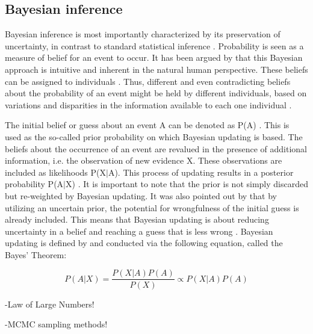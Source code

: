         \subsection{Bayesian inference}
        Bayesian inference is most importantly characterized by its preservation of uncertainty, in contrast to standard statistical inference \citep{davidson2015}. Probability is seen as a measure of belief for an event to occur. It has been argued by \citep{davidson2015}  that this Bayesian approach is intuitive and inherent in the natural human perspective. These beliefs can be assigned to individuals \citep{davidson2015}. Thus, different and even contradicting beliefs about the probability of an event might be held by different individuals, based on variations and disparities in the information available to each one individual \citep{davidson2015}.
        
        The initial belief or guess about an event A can be denoted as P(A) \citep{davidson2015}. This is used as the so-called prior probability on which Bayesian updating is based. The beliefs about the occurrence of an event are revalued in the presence of additional information, i.e. the observation of new evidence X. These observations are included as likelihoods P(X$|$A). This process of updating results in a posterior probability P(A$|$X) \citep{davidson2015}. It is important to note that the prior is not simply discarded but re-weighted by Bayesian updating. It was also pointed out by \citet{davidson2015} that by utilizing an uncertain prior, the potential for wrongfulness of the initial guess is already included. This means that Bayesian updating is about reducing uncertainty in a belief and reaching a guess that is less wrong \citep{davidson2015}.
        Bayesian updating is defined by and conducted via the following equation, called the Bayes' Theorem:
        
        \begin{equation}\label{eq:BayesTheorem}
        P(A|X) = \frac{P(X|A)P(A)}{P(X)}
        \propto P(X|A)P(A)
        \end{equation}
        
        -Law of Large Numbers!
        
        -MCMC sampling methods!
               
